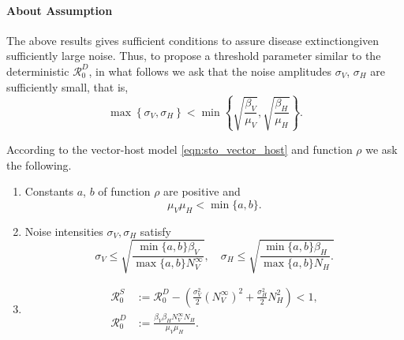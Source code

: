 \paragraph{About Assumption}
The above results gives sufficient conditions to assure 
disease extinction\textemdash given sufficiently large noise. Thus, 
to propose a threshold parameter similar  to the deterministic
$\mathcal{R}_0^D$, in what follows we ask that the noise amplitudes 
$\sigma_V$, $\sigma_H$ are sufficiently small, that is,
\begin{equation}\label{eqn:noise_small_condition}
    \displaystyle
    \max
        \left \{
              \sigma_V, \sigma_H 
        \right\} 
        < 
    \min 
        \left \{
            \sqrt{\frac{\beta_V}{\mu_V}},
            \sqrt{\frac{\beta_H}{\mu_H}}
        \right \}.
\end{equation}
%
%
%
\begin{assumption}\label{ass:extinction}
    According to the vector-host model \eqref{eqn:sto_vector_host} and 
    function
    $\rho$
    we ask the following.
    \begin{enumerate}[\bf{(E\textendash}1)]
        \item 
            Constants $a$, $b$ of function $\rho$ are positive and
            $$
                \mu_V \mu_H < \min \{a, b \}.
            $$
        \item \label{ass:noise_condition}
            Noise intensities $\sigma_V, \sigma_H$ satisfy
            $$
                \sigma_V \leq 
                    \sqrt{
                        \frac{
                            \min\{a, b\}
                            \beta_V
                        }{
                            \max \{a, b \}
                            N_V^{\infty}
                        }
                    },
                 \quad
                \sigma_H \leq
                    \sqrt{
                        \frac{
                            \min\{a, b\}
                            \beta_H
                        }{
                            \max \{a, b \}
                            N_H
                        }.
                    }
            $$
        \item
            \begin{equation*}
                \begin{aligned}
                    \mathcal{R}_0 ^ S &:=
                        \mathcal{R}_0^D - 
                        \left( 
                            \frac{\sigma_V ^ 2}{2} (N_V ^ {\infty}) ^ 2
                            +
                            \frac{\sigma_H ^ 2}{2} N_H ^ 2
                        \right)
                        <1,
                        \\
                    \mathcal{R}_0 ^ D &:=
                            \frac{
                                 \beta_V \beta_H N_V ^ \infty N_H
                            }{
                            \mu_V \mu_H
                            } .
                \end{aligned}
            \end{equation*}
    \end{enumerate}
\end{assumption}        
